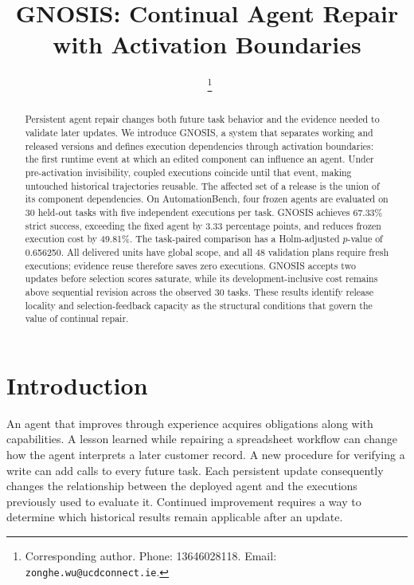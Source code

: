 \documentclass{ecai}
\begin{document}
\begin{frontmatter}
\title{GNOSIS: Continual Agent Repair with Activation Boundaries}
\author[A,B]{~\thanks{Corresponding author. Phone: 13646028118. Email: \nolinkurl{zonghe.wu@ucdconnect.ie}.}}
\address[A]{School of Architecture, Planning and Environmental Policy, University College Dublin, Belfield, Dublin 4, Ireland}
\address[B]{Chang'an-Dublin International College of Transportation, Chang'an University, Xi'an 710018, China}
\begin{abstract}
Persistent agent repair changes both future task behavior and the evidence needed to validate later updates. We introduce GNOSIS, a system that separates working and released versions and defines execution dependencies through activation boundaries: the first runtime event at which an edited component can influence an agent. Under pre-activation invisibility, coupled executions coincide until that event, making untouched historical trajectories reusable. The affected set of a release is the union of its component dependencies. On AutomationBench, four frozen agents are evaluated on 30 held-out tasks with five independent executions per task. GNOSIS achieves 67.33\% strict success, exceeding the fixed agent by 3.33 percentage points, and reduces frozen execution cost by 49.81\%. The task-paired comparison has a Holm-adjusted $p$-value of 0.656250. All delivered units have global scope, and all 48 validation plans require fresh executions; evidence reuse therefore saves zero executions. GNOSIS accepts two updates before selection scores saturate, while its development-inclusive cost remains above sequential revision across the observed 30 tasks. These results identify release locality and selection-feedback capacity as the structural conditions that govern the value of continual repair.
\end{abstract}
\end{frontmatter}

\section{Introduction}
\label{sec:intro}

An agent that improves through experience acquires obligations along with capabilities. A lesson learned while repairing a spreadsheet workflow can change how the agent interprets a later customer record. A new procedure for verifying a write can add calls to every future task. Each persistent update consequently changes the relationship between the deployed agent and the executions previously used to evaluate it. Continued improvement requires a way to determine which historical results remain applicable after an update.
\end{document}
